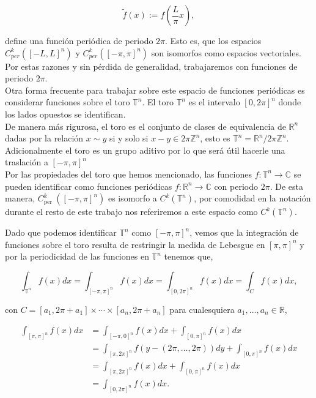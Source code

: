\documentclass[12pt]{article}
\newcommand\R{\ensuremath{\mathbb{R}}}
\newcommand\T{\mathbb{T}}
\begin{document}
$$
\widetilde{f}(x):=f\left(\frac{L}{\pi} x\right),
$$

define una función periódica de periodo $2 \pi$. Esto es, que los espacios $C_{p e r}^k([-L, L]^n)$ y $C_{p e r}^k([-\pi, \pi]^n)$ son isomorfos como espacios vectoriales. Por estas razones y sin pérdida de generalidad, trabajaremos con funciones de periodo $2\pi$.\\

Otra forma frecuente para trabajar sobre este espacio de funciones periódicas es considerar funciones sobre  el toro $\mathbb{T}^n$. El toro $\mathbb{T}^n$ es el intervalo $[0,2 \pi]^n$ donde los lados opuestos se identifican.\\

De manera más rigurosa, el toro es el conjunto de clases de equivalencia de $\mathbb{R}^n$ dadas por la relación $x \sim y$ si y solo si $x-y \in 2 \pi \mathbb{Z}^n$, esto es $\mathbb{T}^n=\mathbb{R}^n/ 2 \pi \mathbb{Z}^n$. Adicionalmente el toro es un grupo aditivo por lo que será útil hacerle una traslación a $[-\pi,\pi]^n$\\

Por las propiedades del toro que hemos mencionado, las funciones $f: \mathbb{T}^n \rightarrow \mathbb{C}$ se pueden identificar como funciones periódicas $f: \mathbb{R}^n \rightarrow \mathbb{C}$ con periodo $2 \pi$. De esta manera, $C_{\text {per }}^k([-\pi, \pi]^n)$ es isomorfo a $C^k(\mathbb{T}^n)$, por comodidad en la notación durante el resto de  este trabajo nos referiremos a este espacio como $C^k(\T^n)$. \cite{ogrianoc}\\

\begin{note}
    Dado que  podemos identificar $\mathbb{T}^n$ como $[-\pi,\pi]^n$, vemos que la integración de funciones sobre el toro resulta de restringir la medida de Lebesgue en $[\pi,\pi]^n$ y por la periodicidad de las funciones en $\mathbb{T}^n$ tenemos que,

    $$\int_{\mathbb{T}^n} f(x) d x=\int_{[-\pi,\pi]^n} f(x) d x=\int_{[0,2\pi]^n} f(x) d x=\int_{C} f(x) d x,$$


    con $C=\left[a_1, 2\pi+a_1\right] \times \cdots \times\left[a_n, 2\pi+a_n\right]$ para cualesquiera $a_1,\ldots,a_n \in \R$, 

    $$\begin{aligned}
    \int_{[\pi, \pi]^n} f(x) d x & =\int_{[-\pi, 0]^n} f(x) d x+\int_{[0, \pi]^n} f(x) d x \\
     & =\int_{[\pi, 2 \pi]^n} f(y-(2 \pi,\ldots,2\pi)) d y+\int_{[0, \pi]^n} f(x) d x \\
    & =\int_{[\pi, 2 \pi]^n} f(x) d x+\int_{[0, \pi]^n} f(x) d x\\
    &=\int_{[0,2\pi]^n} f(x) d x.
    \end{aligned}$$
\end{note}
\end{document}
